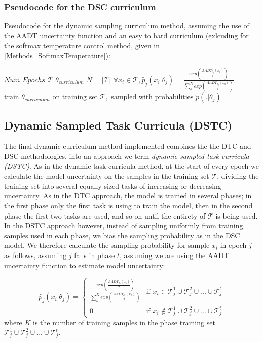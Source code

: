 \subsubsection{Pseudocode for the DSC curriculum}\label{sec:DSCPseudocode}
Pseudocode for the dynamic sampling curriculum method, assuming the use of the AADT uncertainty function and an easy to hard curriculum (exlcuding for the softmax temperature control method, given in \ref{Methods_SoftmaxTemperature}):
\begin{algorithmic}
\REQUIRE $Num\_Epochs$
\REQUIRE $\mathcal{T}$ 
\REQUIRE $\theta_{curriculum}$ 
\STATE  $N = |\mathcal{T}|$
\STATE $\forall x_i \in \mathcal{T}, \tilde{p_j}(x_i | \theta_j) = \frac{exp(\frac{AADT_{\theta_j}(x_i)}{\tau})}{\sum_{k}^{N} exp(\frac{AADT_{\theta_j}(x_k)}{\tau})}$
\STATE $\text{train }  \theta_{curriculum} \text{ on training set } \mathcal{T}, \text{ sampled with probabilities }  \tilde{p}(. | \theta_j)  $
\ENDFOR
\end{algorithmic}

\subsection{Dynamic Sampled Task Curricula (DSTC)}
The final dynamic curriculum method implemented combines the the DTC and DSC methodologies, into an approach we term \textit{dynamic sampled task curricula (DSTC)}. As in the dynamic task curricula method, at the start of every epoch we calculate the model uncertainty on the samples in the training set  $\mathcal{T}$, dividing the training set into several equally sized tasks of increasing or decreasing uncertainty. As in the DTC approach, the model is trained in several phases; in the first phase only the first task is using to train the model, then in the second phase the first two tasks are used, and so on until the entirety of $\mathcal{T}$ is being used. In the DSTC approach however, instead of sampling uniformly from training samples used in each phase, we bias the sampling probability as in the DSC model. We therefore calculate the sampling probability for sample $x_i$ in epoch $j$ as follows, assuming $j$ falls in phase $t$, assuming we are using the AADT uncertainty function to estimate model uncertainty:

\begin{equation}\label{eq:DSC_Prob}
\tilde{p_j}(x_i | \theta_j) = 
\begin{cases} 
\frac{exp(\frac{AADT_{\theta_j}(x_i)}{\tau})}{\sum_{k}^{K} exp(\frac{AADT_{\theta_j}(x_k)}{\tau})} & \text{if } x_i \in \mathcal{T}_j^1 \cup \mathcal{T}_j^2 \cup ... \cup \mathcal{T}_j^t \\
0 & \text{if } x_i  \notin \mathcal{T}_j^1 \cup \mathcal{T}_j^2 \cup ... \cup \mathcal{T}_j^t
\end{cases}
\end{equation}
where $K$ is the number of training samples in the phase training set $\mathcal{T}_j^1 \cup \mathcal{T}_j^2 \cup ... \cup \mathcal{T}_j^t$.

